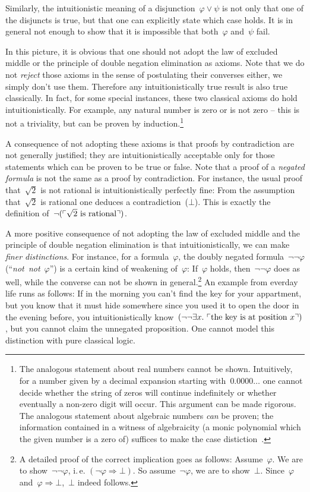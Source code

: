 \documentclass[10pt,reqno,a4paper]{amsbook}
\makeatletter
\theoremstyle{definition}
\theoremstyle{plain}
\theoremstyle{remark}
\newcommand{\?}{\,{:}\,}
\renewcommand{\_}{\mathpunct{.}\,}
\newcommand{\speak}[1]{\ulcorner\text{\textnormal{#1}}\urcorner}
\newcommand{\ie}{i.\,e.\@\xspace}
\newcommand{\notnot}{\emph{not~not}\xspace}
\makeatother
\begin{document}
Similarly, the intuitionistic meaning of a disjunction~$\varphi \vee \psi$ is
not only that one of the disjuncts is true, but that one can explicitly state
which case holds. It is in general not enough to show that it is impossible
that both~$\varphi$ and~$\psi$ fail.

In this picture, it is obvious that one should not adopt the law of excluded
middle or the principle of double negation elimination as axioms. Note that we
do not \emph{reject} those axioms in the sense of postulating their
converses either, we simply don't use them. Therefore any intuitionistically
true result is also true classically. In fact, for some special instances,
these two classical axioms do hold intuitionistically. For example, any natural
number is zero or is not zero -- this is not a triviality, but can be proven by
induction.\footnote{The analogous statement about real numbers cannot be
shown. Intuitively, for a number given by a decimal expansion starting
with~$0.0000\ldots$ one cannot decide whether the string of zeros will continue
indefinitely or whether eventually a non-zero digit will occur. This argument
can be made rigorous. The analogous statement about algebraic numbers
\emph{can} be proven; the information contained in a witness of algebraicity (a
monic polynomial which the given number is a zero of) suffices to make the
case distiction~\cite[Chapter~VI.1, p.~140]{mines-richman-ruitenburg:constructive-algebra}.}

A consequence of not adopting these axioms is that proofs by contradiction are
not generally justified; they are intuitionistically acceptable only for those
statements which can be proven to be true or false. Note that a proof of a
\emph{negated formula} is not the same as a proof by contradiction. For
instance, the usual proof that~$\sqrt{2}$ is not rational is
intuitionistically perfectly fine: From the assumption that~$\sqrt{2}$ is
rational one deduces a contradiction~($\bot$). This is exactly the definition
of~$\neg(\speak{$\sqrt{2}$ is rational})$.

A more positive consequence of not adopting the law of excluded middle and the
principle of double negation elimination is that intuitionistically, we can
make \emph{finer distinctions}. For instance, for a formula~$\varphi$, the doubly
negated formula~$\neg\neg\varphi$ (``\notnot~$\varphi$'') is a certain kind of weakening of~$\varphi$:
If~$\varphi$ holds, then~$\neg\neg\varphi$ does as well, while the converse can
not be shown in general.\footnote{A detailed proof of the correct implication
goes as follows: Assume~$\varphi$. We are to show~$\neg\neg\varphi$, \ie
$(\neg\varphi \Rightarrow \bot)$. So assume~$\neg\varphi$, we are to
show~$\bot$. Since~$\varphi$ and~$\varphi \Rightarrow \bot$,~$\bot$ indeed
follows.} An example from everday life runs as follows: If in the morning you
can't find the key for your appartment, but you know that it must hide
somewhere since you used it to open the door in the evening before, you
intuitionistically know~$(\neg\neg\exists x\_ \speak{the key is at position
$x$})$, but you cannot claim the unnegated proposition. One cannot model this
distinction with pure classical logic.
\end{document}
